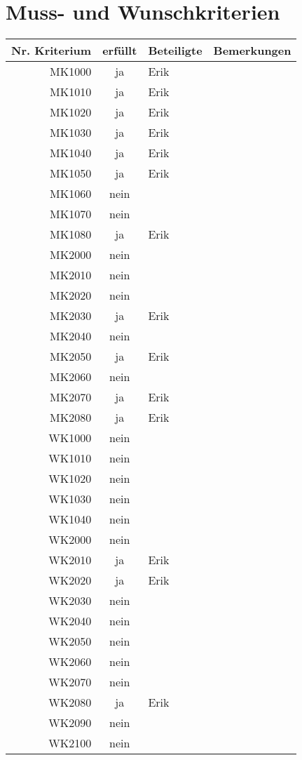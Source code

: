 \chapter{Muss- und Wunschkriterien}
\begin{tabular}{r|c|l|l}
	Nr. Kriterium & erfüllt & Beteiligte & Bemerkungen \\
	\hline
	MK1000 & ja & Erik & \\
	MK1010 & ja & Erik & \\
	MK1020 & ja & Erik & \\
	MK1030 & ja & Erik & \\
	MK1040 & ja & Erik & \\
	MK1050 & ja & Erik & \\
	MK1060 & nein &  & \\
	MK1070 & nein &  & \\
	MK1080 & ja & Erik & \\
	MK2000 & nein &  & \\
	MK2010 & nein &  & \\
	MK2020 & nein &  & \\
	MK2030 & ja & Erik & \\
	MK2040 & nein &  & \\
	MK2050 & ja & Erik & \\
	MK2060 & nein &  & \\
	MK2070 & ja & Erik & \\
	MK2080 & ja & Erik & \\
	\hline\hline
	WK1000 & nein &  & \\
	WK1010 & nein &  & \\
	WK1020 & nein &  & \\
	WK1030 & nein &  & \\
	WK1040 & nein &  & \\
	WK2000 & nein &  & \\
	WK2010 & ja & Erik & \\
	WK2020 & ja & Erik & \\
	WK2030 & nein &  & \\
	WK2040 & nein &  & \\
	WK2050 & nein &  & \\
	WK2060 & nein &  & \\
	WK2070 & nein &  & \\
	WK2080 & ja & Erik & \\
	WK2090 & nein &  & \\
	WK2100 & nein &  & \\
	
\end{tabular}